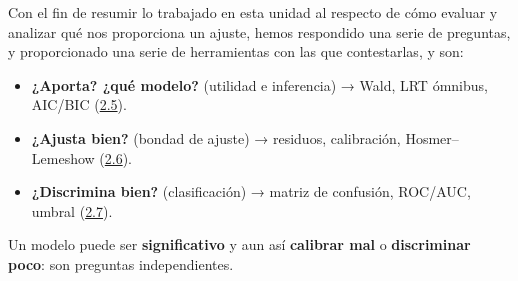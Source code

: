 \documentclass[
  letterpaper,
  DIV=11,
  numbers=noendperiod]{scrartcl}
\providecommand{\tightlist}{%
  \setlength{\itemsep}{0pt}\setlength{\parskip}{0pt}}\usepackage{longtable,booktabs,array}
\begin{document}
\begin{tcolorbox}[enhanced jigsaw, breakable, colframe=quarto-callout-note-color-frame, left=2mm, arc=.35mm, colbacktitle=quarto-callout-note-color!10!white, toprule=.15mm, colback=white, coltitle=black, rightrule=.15mm, opacitybacktitle=0.6, title=\textcolor{quarto-callout-note-color}{\faInfo}\hspace{0.5em}{Tres preguntas, tres herramientas}, titlerule=0mm, toptitle=1mm, bottomtitle=1mm, leftrule=.75mm, bottomrule=.15mm, opacityback=0]

Con el fin de resumir lo trabajado en esta unidad al respecto de cómo
evaluar y analizar qué nos proporciona un ajuste, hemos respondido una
serie de preguntas, y proporcionado una serie de herramientas con las
que contestarlas, y son:

\begin{itemize}
\tightlist
\item
  \textbf{¿Aporta? ¿qué modelo?} (utilidad e inferencia) → Wald, LRT
  ómnibus, AIC/BIC (\protect\hyperlink{sec-u12-inferencia}{2.5}).
\item
  \textbf{¿Ajusta bien?} (bondad de ajuste) → residuos, calibración,
  Hosmer--Lemeshow (\protect\hyperlink{sec-u12-diagnostico}{2.6}).
\item
  \textbf{¿Discrimina bien?} (clasificación) → matriz de confusión,
  ROC/AUC, umbral (\protect\hyperlink{sec-u12-evaluacion}{2.7}).
\end{itemize}

Un modelo puede ser \textbf{significativo} y aun así \textbf{calibrar
mal} o \textbf{discriminar poco}: son preguntas independientes.

\end{tcolorbox}
\end{document}
